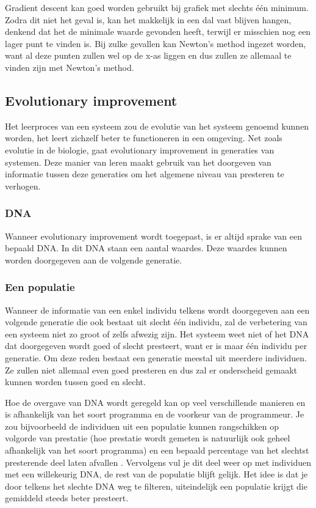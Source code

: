 Gradient descent kan goed worden gebruikt bij grafiek met slechts \'e\'en minimum. Zodra dit niet het geval is, kan het makkelijk in een dal vast blijven hangen, denkend dat het de minimale waarde gevonden heeft, terwijl er misschien nog een lager punt te vinden is. Bij zulke gevallen kan Newton’s method ingezet worden, want al deze punten zullen wel op de x-as liggen en dus zullen ze allemaal te vinden zijn met Newton’s method.

\subsection{Evolutionary improvement}
Het leerproces van een systeem zou de evolutie van het systeem genoemd kunnen worden, het leert zichzelf beter te functioneren in een omgeving. Net zoals evolutie in de biologie, gaat evolutionary improvement in generaties van systemen. Deze manier van leren maakt gebruik van het doorgeven van informatie tussen deze generaties om het algemene niveau van presteren te verhogen.

\subsubsection{DNA}
Wanneer evolutionary improvement wordt toegepast, is er altijd sprake van een bepaald DNA. In dit DNA staan een aantal waardes. Deze waardes kunnen worden doorgegeven aan de volgende generatie.

\subsubsection{Een populatie}
Wanneer de informatie van een enkel individu telkens wordt doorgegeven aan een volgende generatie die ook bestaat uit slecht één individu, zal de verbetering van een systeem niet zo groot of zelfs afwezig zijn. Het systeem weet niet of het DNA dat doorgegeven wordt goed of slecht presteert, want er is maar één individu per generatie. Om deze reden bestaat een generatie meestal uit meerdere individuen. Ze zullen niet allemaal even goed presteren en dus zal er onderscheid gemaakt kunnen worden tussen goed en slecht.

Hoe de overgave van DNA wordt geregeld kan op veel verschillende manieren en is afhankelijk van het soort programma en de voorkeur van de programmeur. Je zou bijvoorbeeld de individuen uit een populatie kunnen rangschikken op volgorde van prestatie (hoe prestatie wordt gemeten is natuurlijk ook geheel afhankelijk van het soort programma) en een bepaald percentage van het slechtst presterende deel laten afvallen \cite{carrykh}. Vervolgens vul je dit deel weer op met individuen met een willekeurig DNA, de rest van de populatie blijft gelijk. Het idee is dat je door telkens het slechte DNA weg te filteren, uiteindelijk een populatie krijgt die gemiddeld steeds beter presteert.

